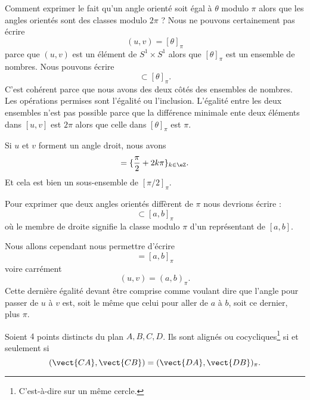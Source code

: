 \begin{normaltext}
	Comment exprimer le fait qu'un angle orienté soit égal à \( \theta\) modulo \( \pi\) alors que les angles orientés sont des classes modulo \( 2\pi\) ? Nous ne pouvons certainement pas écrire
	\begin{equation}
		(u,v)=[\theta]_{\pi}
	\end{equation}
	parce que \( (u,v)\) est un élément de \( S^1\times S^1\) alors que \( [\theta]_{\pi}\) est un ensemble de nombres. Nous pouvons écrire
	\begin{equation}
		[u,v]\subset [\theta]_{\pi}.
	\end{equation}
	C'est cohérent parce que nous avons des deux côtés des ensembles de nombres. Les opérations permises sont l'égalité ou l'inclusion. L'égalité entre les deux ensembles n'est pas possible parce que la différence minimale ente deux éléments dans \( [u,v]\) est \( 2\pi\) alors que celle dans \( [\theta]_{\pi}\) est \( \pi\).

	Si \( u\) et \( v\) forment un angle droit, nous avons
	\begin{equation}
		[u,v]=\{ \frac{ \pi }{2}+2k\pi \}_{k\in \eZ}.
	\end{equation}
	Et cela est bien un sous-ensemble de \( [\pi/2]_{\pi}\).

	Pour exprimer que deux angles orientés diffèrent de \( \pi\) nous devrions écrire :
	\begin{equation}
		[u,v]\subset[a,b]_{\pi}
	\end{equation}
	où le membre de droite signifie la classe modulo \( \pi\) d'un représentant de \( [a,b]\).

	Nous allons cependant nous permettre d'écrire
	\begin{equation}
		[u,v]=[a,b]_{\pi}
	\end{equation}
	voire carrément
	\begin{equation}
		(u,v)=(a,b)_{\pi}.
	\end{equation}
	Cette dernière égalité devant être comprise comme voulant dire que l'angle pour passer de \( u\) à \( v\) est, soit le même que celui pour aller de \( a\) à \( b\), soit ce dernier, plus \( \pi\).
\end{normaltext}

\begin{theorem}      \label{THOooUDUGooTJKDpO}
	Soient \( 4\) points distincts du plan \( A,B,C,D\). Ils sont alignés ou cocycliques\footnote{C'est-à-dire sur un même cercle.} si et seulement si
	\begin{equation}
		(\vect{ CA },\vect{ CB })=(\vect{ DA },\vect{ DB })_{\pi}.
	\end{equation}
\end{theorem}


